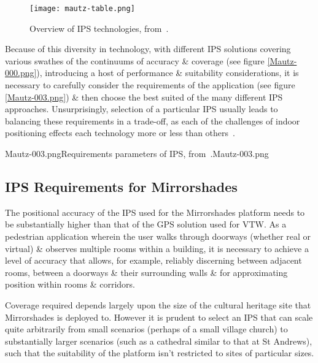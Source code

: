 \begin{figure}[h]
	\begin{center}
		\texttt{[image: mautz-table.png]}
		\caption{Overview of IPS technologies, from~\cite{Mautz2012}.}
		\label{mautz-table.png}
	\end{center}
\end{figure}

Because of this diversity in technology, with different IPS solutions covering various swathes of the continuums of accuracy \& coverage (see figure \ref{Mautz-000.png}), introducing a host of performance \& suitability considerations, it is necessary to carefully consider the requirements of the application (see figure \ref{Mautz-003.png}) \& then choose the best suited of the many different IPS approaches. Unsurprisingly, selection of a particular IPS usually leads to balancing these requirements in a trade-off, as each of the challenges of indoor positioning effects each technology more or less than others~\cite{Mautz2009}.

       {Mautz-003.png}{Requirements parameters of IPS, from~\cite{Mautz2012}.}{Mautz-003.png}


\subsection{IPS Requirements for Mirrorshades}
The positional accuracy of the IPS used for the Mirrorshades platform needs to be substantially higher than that of the GPS solution used for VTW. As a pedestrian application wherein the user walks through doorways (whether real or virtual) \& observes multiple rooms within a building, it is necessary to achieve a level of accuracy that allows, for example, reliably discerning between adjacent rooms, between a doorways \& their surrounding walls \& for approximating position within rooms \& corridors.

Coverage required depends largely upon the size of the cultural heritage site that Mirrorshades is deployed to. However it is prudent to select an IPS that can scale quite arbitrarily from small scenarios (perhaps of a small village church) to substantially larger scenarios (such as a cathedral similar to that at St Andrews), such that the suitability of the platform isn't restricted to sites of particular sizes.

